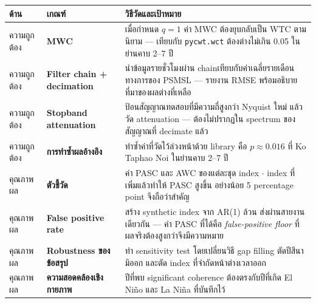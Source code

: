 \documentclass[a4paper,12pt]{article}
\begin{document}
\begin{center}
\footnotesize
\begin{tabular}{@{}L{1.9cm}L{3.5cm}L{8.9cm}@{}}
\toprule
\textbf{ด้าน} & \textbf{เกณฑ์} & \textbf{วิธีวัดและเป้าหมาย} \\
\midrule
ความถูกต้อง & \textbf{MWC}
  & เมื่อกำหนด $q = 1$ ค่า MWC ต้องยุบกลับเป็น WTC ตามนิยาม --- เทียบกับ \texttt{pycwt.wct}
    ต้องต่างไม่เกิน 0.05 ในย่านคาบ 2--7 ปี \\
ความถูกต้อง & \textbf{Filter chain + decimation}
  & นำข้อมูลรายชั่วโมงผ่าน chainเทียบกับค่าเฉลี่ยรายเดือนทางการของ PSMSL
    --- รายงาน RMSE พร้อมอธิบายที่มาของผลต่างที่เหลือ \\
ความถูกต้อง & \textbf{Stopband attenuation}
  & ป้อนสัญญาณทดสอบที่มีความถี่สูงกว่า Nyquist ใหม่ แล้ววัด attenuation
    --- ต้องไม่ปรากฏใน spectrum ของสัญญาณที่ decimate แล้ว \\
ความถูกต้อง & \textbf{การทำซ้ำผลอ้างอิง}
  & ทำซ้ำค่าที่วัดไว้ล่วงหน้าด้วย library คือ $p \approx 0.016$ ที่ Ko Taphao Noi ในย่านคาบ 2--7 ปี \\
\addlinespace[2pt]
คุณภาพผล & \textbf{ตัวชี้วัด}
  & ค่า PASC และ AWC ของแต่ละชุด index $\cdot$ index ที่เพิ่มแล้วทำให้ PASC สูงขึ้น
    อย่างน้อย 5 percentage point จึงถือว่าสำคัญ \\
คุณภาพผล & \textbf{False positive rate}
  & สร้าง synthetic index จาก AR(1) ล้วน ส่งผ่านสายงานเดียวกัน --- ค่า PASC ที่ได้คือ
    \textit{false-positive floor} ที่ผลจริงต้องสูงกว่าจึงมีความหมาย \\
คุณภาพผล & \textbf{Robustness ของข้อสรุป}
  & ทำ sensitivity test โดยเปลี่ยนวิธี gap filling ตัดปีสึนามิออก และตัด index
    ที่จำกัดหน้าต่างเวลาออก \\
คุณภาพผล & \textbf{ความสอดคล้องเชิงกายภาพ}
  & ปีที่พบ significant coherence ต้องตรงกับปีที่เกิด El Niño และ La Niña ที่บันทึกไว้ \\
\bottomrule
\end{tabular}
\end{center}

\clearpage
\end{document}
